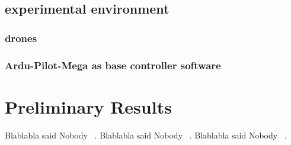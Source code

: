 \documentclass[11pt]{article}
\begin{document}
\subsection{experimental environment}
\subsubsection{drones}
\subsubsection{Ardu-Pilot-Mega as base controller software}

\section{Preliminary Results}
Blablabla said Nobody ~\cite{Merav}.
Blablabla said Nobody ~\cite{APM}.
Blablabla said Nobody ~\cite{RTComposer}.


\begin{samepage}
    {}
    
\end{samepage}
\end{document}
